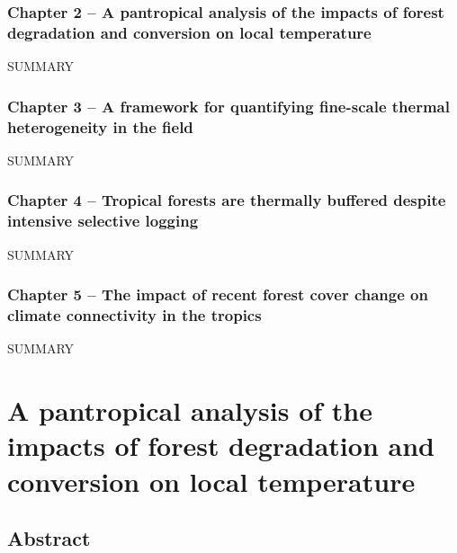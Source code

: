 \documentclass[12pt,a4paper,]{report}
\theoremstyle{definition}
\theoremstyle{definition}
\theoremstyle{definition}
\theoremstyle{remark}
\begin{document}
\subsection{Chapter 2 -- A pantropical analysis of the impacts of forest
degradation and conversion on local
temperature}\label{chapter-2-a-pantropical-analysis-of-the-impacts-of-forest-degradation-and-conversion-on-local-temperature}

SUMMARY

\subsection{Chapter 3 -- A framework for quantifying fine-scale thermal
heterogeneity in the
field}\label{chapter-3-a-framework-for-quantifying-fine-scale-thermal-heterogeneity-in-the-field}

SUMMARY

\subsection{Chapter 4 -- Tropical forests are thermally buffered despite
intensive selective
logging}\label{chapter-4-tropical-forests-are-thermally-buffered-despite-intensive-selective-logging}

SUMMARY

\subsection{Chapter 5 -- The impact of recent forest cover change on
climate connectivity in the
tropics}\label{chapter-5-the-impact-of-recent-forest-cover-change-on-climate-connectivity-in-the-tropics}

SUMMARY

\chapter{A pantropical analysis of the impacts of forest degradation and
conversion on local
temperature}\label{a-pantropical-analysis-of-the-impacts-of-forest-degradation-and-conversion-on-local-temperature}

\section{Abstract}\label{abstract-1}
\end{document}
